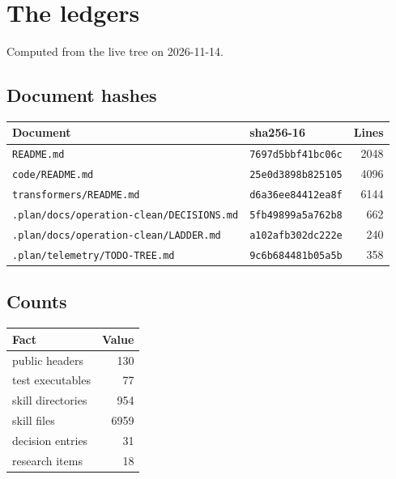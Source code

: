 \chapter{The ledgers}

Computed from the live tree on 2026-11-14.

\section{Document hashes}
\begin{longtable}{@{}llr@{}}
\toprule
Document & sha256-16 & Lines\\
\midrule
\endhead
\texttt{README.md} & \texttt{7697d5bbf41bc06c} & 2048\\
\texttt{code/README.md} & \texttt{25e0d3898b825105} & 4096\\
\texttt{transformers/README.md} & \texttt{d6a36ee84412ea8f} & 6144\\
\texttt{.plan/docs/operation-clean/DECISIONS.md} & \texttt{5fb49899a5a762b8} & 662\\
\texttt{.plan/docs/operation-clean/LADDER.md} & \texttt{a102afb302dc222e} & 240\\
\texttt{.plan/telemetry/TODO-TREE.md} & \texttt{9c6b684481b05a5b} & 358\\
\bottomrule
\end{longtable}

\section{Counts}
\begin{tabular}{@{}lr@{}}
\toprule
Fact & Value\\
\midrule
public headers & 130\\
test executables & 77\\
skill directories & 954\\
skill files & 6959\\
decision entries & 31\\
research items & 18\\
\bottomrule
\end{tabular}

